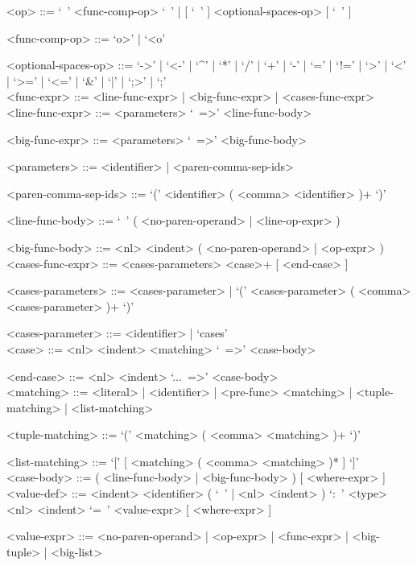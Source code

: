 \documentclass{article}
\begin{document}
\begin{grammar}
<op> ::= `\ ' <func-comp-op> `\ ' | [ `\ ' ] <optional-spaces-op> [ `\ ' ]

<func-comp-op> ::= `o>' | `<o'

<optional-spaces-op> ::= 
`->' | `<-' | `^' | `*' | `/' | `+' | `-' | `=' | `!=' | `>' | `<' | `>=' | `<=' |
`\&' | `|' | `;>' | `;'
\\

<func-expr> ::= <line-func-expr> | <big-func-expr> | <cases-func-expr>
\\

<line-func-expr> ::= <parameters> `\ =>' <line-func-body>

<big-func-expr> ::= <parameters> `\ =>' <big-func-body>

<parameters> ::= <identifier> | <paren-comma-sep-ids>

<paren-comma-sep-ids> ::= `(' <identifier> ( <comma> <identifier> )+ `)'

<line-func-body> ::= `\ ' ( <no-paren-operand> | <line-op-expr> )

<big-func-body> ::= <nl> <indent> ( <no-paren-operand> | <op-expr> )
\\

<cases-func-expr> ::= <cases-parameters> <case>+ [ <end-case> ]

<cases-parameters> ::=
<cases-parameter> | `(' <cases-parameter> ( <comma> <cases-parameter> )+ `)'

<cases-parameter> ::= <identifier> | `cases'
\\

<case> ::=  <nl> <indent> <matching> `\ =>' <case-body>

<end-case> ::= <nl> <indent> `...\ =>' <case-body>
\\

<matching> ::= 
<literal> | <identifier> | <pre-func> <matching> | <tuple-matching> |
<list-matching>

<tuple-matching> ::= `(' <matching> ( <comma> <matching> )+ `)'

<list-matching> ::= `[' [ <matching> ( <comma> <matching> )* ] `]'
\\

<case-body> ::= ( <line-func-body> | <big-func-body> ) [ <where-expr> ]
\\

<value-def> ::= 
<indent> <identifier> 
( `\ ' | <nl> <indent> ) `:\ ' <type> 
<nl> <indent> `=\ ' <value-expr> [ <where-expr> ]

<value-expr> ::=
<no-paren-operand> | <op-expr> | <func-expr> | <big-tuple> | <big-list>


\end{grammar}
\end{document}
